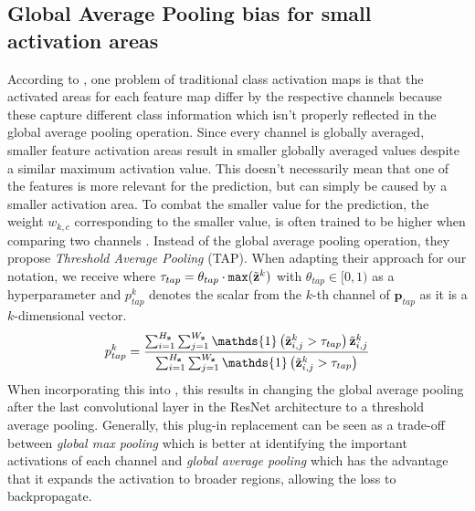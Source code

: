 \subsection{Global Average Pooling bias for small activation areas}
According to \citet{Bae2020RethinkingCAM}, one problem of traditional class activation maps is that the activated areas for each feature map differ by the respective channels because these capture different class information which isn't properly reflected in the global average pooling operation. Since every channel is globally averaged, smaller feature activation areas result in smaller globally averaged values despite a similar maximum activation value. This doesn't necessarily mean that one of the features is more relevant for the prediction, but can simply be caused by a smaller activation area. To combat the smaller value for the prediction, the weight $w_{k,c}$ corresponding to the smaller value, is often trained to be higher when comparing two channels \citep{Bae2020RethinkingCAM}. Instead of the global average pooling operation, they propose \emph{Threshold Average Pooling} (TAP). When adapting their approach for our notation, we receive  where $\tau_{t a p} = \theta_{tap} \cdot \mathtt{max}(\Tilde{\mathbf{z}}^k)$ with $\theta_{tap} \in [0,1)$ as a hyperparameter and $p^k_{tap}$ denotes the scalar from the $k$-th channel of $\mathbf{p}_{tap}$ as it is a $k$-dimensional vector. 
\begin{equation}
\label{eq:tap}
p^k_{tap} =\frac{\sum_{i=1}^{H_\mathbf{z}} \sum_{j=1}^{W_\mathbf{z}} \mathds{1}\left(\Tilde{\mathbf{z}}^k_{i,j} > \tau_{t a p}\right) \Tilde{\mathbf{z}}^k_{i,j}}{\sum_{i=1}^{H_\mathbf{z}} \sum_{j=1}^{W_\mathbf{z}} \mathds{1}\left(\Tilde{\mathbf{z}}^k_{i,j} > \tau_{t a p}\right)}
\end{equation}
When incorporating this into \divcam, this results in changing the global average pooling after the last convolutional layer in the ResNet architecture to a threshold average pooling. Generally, this plug-in replacement can be seen as a trade-off between \emph{global max pooling} which is better at identifying the important activations of each channel and \emph{global average pooling} which has the advantage that it expands the activation to broader regions, allowing the loss to backpropagate.

